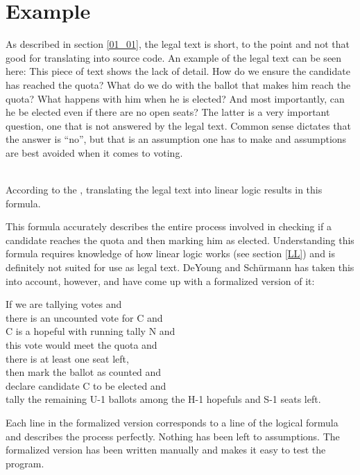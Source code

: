 \section{Example}
\label{E}

As described in section \ref{01_01}, the legal text is short, to the point and not that good for translating into source code. An example of the legal text can be seen here:
This piece of text shows the lack of detail. How do we ensure the candidate has reached the quota? What do we do with the ballot that makes him reach the quota? What happens with him when he is elected? And most importantly, can he be elected even if there are no open seats? The latter is a very important question, one that is not answered by the legal text. Common sense dictates that the answer is “no”, but that is an assumption one has to make and assumptions are best avoided when it comes to voting.

 \\
According to the , translating the legal text into linear logic results in this formula.

\begin{texto}
\end{texto}

This formula accurately describes the entire process involved in checking if a candidate reaches the quota and then marking him as elected. Understanding this formula requires knowledge of how linear logic works (see section \ref{LL}) and is definitely not suited for use as legal text. DeYoung and Schürmann has taken this into account, however, and have come up with a formalized version of it:

\begin{texto} 
If we are tallying votes and \\
there is an uncounted vote for C and \\
C is a hopeful with running tally N and \\
this vote would meet the quota and \\
there is at least one seat left, \\
then mark the ballot as counted and \\
declare candidate C to be elected and \\
tally the remaining U-1 ballots among the H-1 hopefuls and S-1 seats left.
\end{texto}

Each line in the formalized version corresponds to a line of the logical formula and describes the process perfectly. Nothing has been left to assumptions. The formalized version has been written manually and makes it easy to test the program.